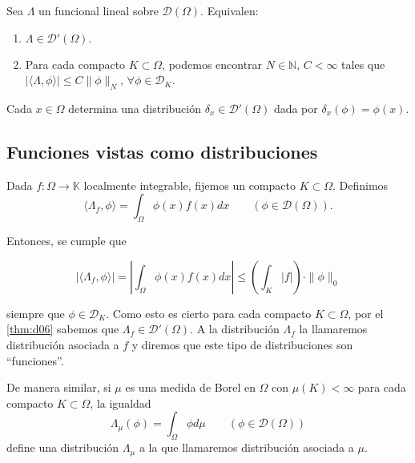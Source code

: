 \begin{teorema}\label{thm:d06}
Sea $\Lambda$ un funcional lineal sobre $\mathcal{D}(\Omega)$. Equivalen: 
\begin{enumerate}
\item $\Lambda\in \mathcal{D}'(\Omega).$
\item Para cada compacto $K\subset \Omega$, podemos encontrar $N\in\mathds{N}$, $C<\infty$ tales que $\vert \langle\Lambda , \phi \rangle\vert \leq C \parallel \phi \parallel_{N}$, $\forall \phi \in \mathcal{D}_{K}$.
\end{enumerate}
\end{teorema}
\begin{observacion}
Cada $x\in\Omega$ determina una distribución $\delta_{x}\in\mathcal{D}'(\Omega)$ dada por $\delta_{x}(\phi) = \phi(x)$.
\end{observacion}

\subsection{Funciones vistas como distribuciones} %


Dada $f:\Omega\rightarrow\mathds{K} $ localmente integrable, fijemos un compacto $K\subset\Omega$. Definimos $$\langle \Lambda_{f}, \phi\rangle = \int_{\Omega}\phi(x)f(x)dx \qquad (\phi\in\mathcal{D}(\Omega)).$$

Entonces, se cumple que 

\begin{equation}
\vert \langle \Lambda_{f},\phi \rangle \vert = \left\vert \int_{\Omega}\phi(x)f(x)dx \right\vert \leq \left( \int_{K} \vert f \vert \right) \cdot \parallel\phi\parallel_{0}
\end{equation}

siempre que $\phi\in \mathcal{D}_{K}$. Como esto es cierto para cada compacto $K\subset\Omega$, por el \autoref{thm:d06} sabemos que $\Lambda_{f}\in\mathcal{D}'(\Omega)$. A la distribución $\Lambda_{f}$ la llamaremos distribución asociada a $f$ y diremos que este tipo de distribuciones son ``funciones''. 

De manera similar, si $\mu$ es una medida de Borel en $\Omega$ con $\mu (K)<\infty$ para cada compacto $K\subset\Omega$, la igualdad
\begin{equation}
\Lambda_{\mu}(\phi) = \int_{\Omega} \phi d\mu \qquad (\phi\in \mathcal{D}(\Omega))
\end{equation}
define una distribución $\Lambda_{\mu}$ a la que llamaremos distribución asociada a $\mu$. 

